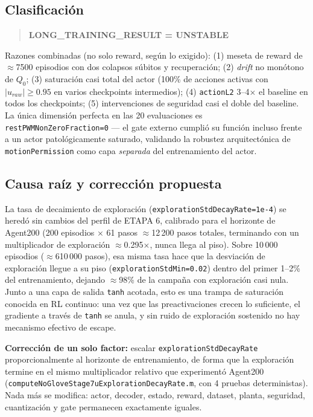 \documentclass[11pt,a4paper]{article}
\begin{document}
\subsection{Clasificación}

\begin{quote}
\textbf{LONG\_TRAINING\_RESULT = UNSTABLE}
\end{quote}

Razones combinadas (no solo reward, según lo exigido): (1) meseta de reward de
$\approx$7500 episodios con dos colapsos súbitos y recuperación; (2) \emph{drift} no
monótono de $Q_0$; (3) saturación casi total del actor (100\% de acciones activas con
$|u_{raw}|\geq0.95$ en varios checkpoints intermedios); (4) \texttt{actionL2} 3--4$\times$
el baseline en todos los checkpoints; (5) intervenciones de seguridad casi el doble del
baseline. La única dimensión perfecta en las 20 evaluaciones es
\texttt{restPWMNonZeroFraction=0} --- el gate externo cumplió su función incluso frente
a un actor patológicamente saturado, validando la robustez arquitectónica de
\texttt{motionPermission} como capa \emph{separada} del entrenamiento del actor.

\subsection{Causa raíz y corrección propuesta}

La tasa de decaimiento de exploración (\texttt{explorationStdDecayRate=1e-4}) se
heredó sin cambios del perfil de ETAPA 6, calibrado para el horizonte de Agent200
(200 episodios $\times$ 61 pasos $\approx$12\,200 pasos totales, terminando con un
multiplicador de exploración $\approx$0.295$\times$, nunca llega al piso). Sobre
10\,000 episodios ($\approx$610\,000 pasos), esa misma tasa hace que la desviación de
exploración llegue a su piso (\texttt{explorationStdMin=0.02}) dentro del primer 1--2\%
del entrenamiento, dejando $\approx$98\% de la campaña con exploración casi nula. Junto
a una capa de salida \texttt{tanh} acotada, esto es una trampa de saturación conocida
en RL continuo: una vez que las preactivaciones crecen lo suficiente, el gradiente a
través de \texttt{tanh} se anula, y sin ruido de exploración sostenido no hay mecanismo
efectivo de escape.

\textbf{Corrección de un solo factor:} escalar \texttt{explorationStdDecayRate}
proporcionalmente al horizonte de entrenamiento, de forma que la exploración termine
en el mismo multiplicador relativo que experimentó Agent200
(\texttt{computeNoGloveStage7uExplorationDecayRate.m}, con 4 pruebas deterministas).
Nada más se modifica: actor, decoder, estado, reward, dataset, planta, seguridad,
cuantización y gate permanecen exactamente iguales.
\end{document}
